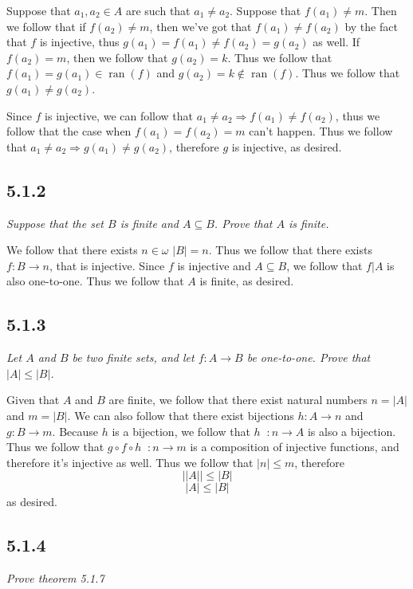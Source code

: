 \documentclass[11pt,oneside,titlepage]{book}
\DeclareMathOperator \inv {^{-1}}
\DeclareMathOperator \ra {\Rightarrow}
\DeclareMathOperator \ran {ran}
\begin{document}
Suppose that $a_1, a_2 \in A$ are such that $a_1 \neq a_2$.
Suppose that $f(a_1) \neq m$. Then we follow that if $f(a_2) \neq m$, then
we've got that $f(a_1) \neq f(a_2)$ by the fact that $f$ is injective, thus
$g(a_1) = f(a_1) \neq f(a_2) = g(a_2)$ as well.
If $f(a_2) = m$, then we follow that $g(a_2) = k$. Thus we follow that
$f(a_1) = g(a_1) \in \ran(f)$ and $g(a_2) = k \notin \ran(f)$. Thus we follow that
$g(a_1) \neq g(a_2)$.

Since $f$ is injective, we can follow that $a_1 \neq  a_2 \ra f(a_1) \neq f(a_2)$, thus
we follow that the case when $f(a_1) = f(a_2) = m$ can't happen. Thus we follow that
$a_1 \neq a_2 \ra g(a_1) \neq g(a_2)$, therefore $g$ is injective, as desired.

\subsection*{5.1.2}

\textit{Suppose that the set $B$ is finite and $A \subseteq B$. Prove that $A$ is finite.}

We follow that there exists $n \in \omega$ $|B| = n$. Thus we follow that
there exists $f: B \to n$, that is injective. Since $f$ is injective and $A \subseteq B$,
we follow that $f|A$ is also one-to-one. Thus we follow that $A$ is finite, as desired.

\subsection*{5.1.3}

\textit{Let $A$ and $B$ be two finite sets, and let $f: A \to B$ be one-to-one. Prove
  that $|A| \leq |B|$. }

Given that $A$ and $B$ are finite, we follow that there exist natural numbers $n = |A|$ and
$m = |B|$. We can also follow that there exist bijections $h: A \to n$ and $g: B \to m$.
Because $h$ is a bijection, we follow that $h \inv: n \to A$ is also a bijection.
Thus we follow that $g \circ f \circ h \inv: n \to m $ is a composition of injective functions,
and therefore it's injective as well. Thus we follow that $|n| \leq m$, therefore
$$||A|| \leq |B|$$
$$|A| \leq |B|$$
as desired.

\subsection*{5.1.4}

\textit{Prove theorem 5.1.7 }
\end{document}

